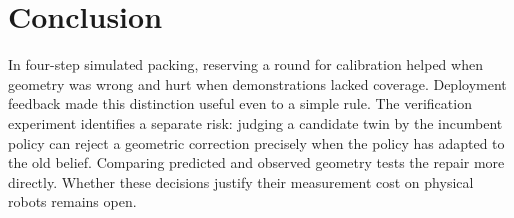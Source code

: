 \section{Conclusion}
In four-step simulated packing, reserving a round for calibration helped when geometry was wrong and hurt when demonstrations lacked coverage. Deployment feedback made this distinction useful even to a simple rule. The verification experiment identifies a separate risk: judging a candidate twin by the incumbent policy can reject a geometric correction precisely when the policy has adapted to the old belief. Comparing predicted and observed geometry tests the repair more directly. Whether these decisions justify their measurement cost on physical robots remains open.
